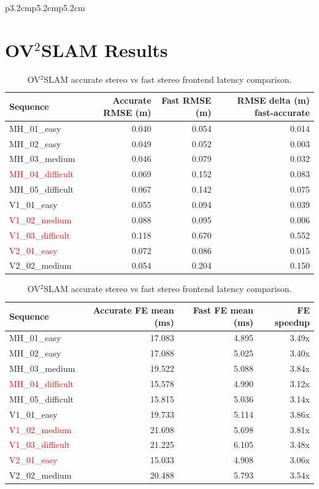 \documentclass[11pt]{article}
\begin{document}
\begin{table}[ht]
\begin{tabular}{p{3.2cm}p{5.2cm}p{5.2cm}}
\section{OV$^{2}$SLAM Results}

\begin{table}[H]
\centering
\small
\caption{OV$^{2}$SLAM accurate stereo vs fast stereo per-sequence RMSE comparison.}
\label{tab:ov2_accurate_fast_rmse_summary}
\begin{tabular}{lrrr}
\toprule
Sequence & Accurate RMSE (m) & Fast RMSE (m) & RMSE delta (m) fast-accurate \\
\midrule
MH\_01\_easy & 0.040 & 0.054 & 0.014 \\
MH\_02\_easy & 0.049 & 0.052 & 0.003 \\
MH\_03\_medium & 0.046 & 0.079 & 0.032 \\
\textcolor{red}{MH\_04\_difficult} & 0.069 & 0.152 & 0.083 \\
MH\_05\_difficult & 0.067 & 0.142 & 0.075 \\
V1\_01\_easy & 0.055 & 0.094 & 0.039 \\
\textcolor{red}{V1\_02\_medium} & 0.088 & 0.095 & 0.006 \\
\textcolor{red}{V1\_03\_difficult} & 0.118 & 0.670 & 0.552 \\
\textcolor{red}{V2\_01\_easy} & 0.072 & 0.086 & 0.015 \\
V2\_02\_medium & 0.054 & 0.204 & 0.150 \\
\bottomrule
\end{tabular}
\end{table}

\begin{table}[H]
\centering
\small
\caption{OV$^{2}$SLAM accurate stereo vs fast stereo frontend latency comparison.}
\label{tab:ov2_accurate_fast_fe_summary}
\begin{tabular}{lrrr}
\toprule
Sequence & Accurate FE mean (ms) & Fast FE mean (ms) & FE speedup \\
\midrule
MH\_01\_easy & 17.083 & 4.895 & 3.49x \\
MH\_02\_easy & 17.088 & 5.025 & 3.40x \\
MH\_03\_medium & 19.522 & 5.088 & 3.84x \\
\textcolor{red}{MH\_04\_difficult} & 15.578 & 4.990 & 3.12x \\
MH\_05\_difficult & 15.815 & 5.036 & 3.14x \\
V1\_01\_easy & 19.733 & 5.114 & 3.86x \\
\textcolor{red}{V1\_02\_medium} & 21.698 & 5.698 & 3.81x \\
\textcolor{red}{V1\_03\_difficult} & 21.225 & 6.105 & 3.48x \\
\textcolor{red}{V2\_01\_easy} & 15.033 & 4.908 & 3.06x \\
V2\_02\_medium & 20.488 & 5.793 & 3.54x \\
\bottomrule
\end{tabular}
\end{table}


\end{tabular}
\end{table}
\end{document}
